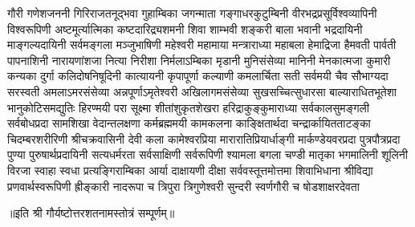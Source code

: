 
\twolineshloka
{गौरी गणेशजननी गिरिराजतनूद्भवा}
{गुहाम्बिका जगन्माता गङ्गाधरकुटुम्बिनी}
\twolineshloka
{वीरभद्रप्रसूर्विश्वव्यापिनी विश्वरूपिणी}
{अष्टमूर्त्यात्मिका कष्टदारिद्र्यशमनी शिवा}
\twolineshloka
{शाम्भवी शङ्करी बाला भवानी भद्रदायिनी}
{माङ्गल्यदायिनी सर्वमङ्गला मञ्जुभाषिणी}
\twolineshloka
{महेश्वरी महामाया मन्त्राराध्या महाबला}
{हेमाद्रिजा हैमवती पार्वती पापनाशिनी}
\twolineshloka
{नारायणांशजा नित्या निरीशा निर्मलाऽम्बिका}
{मृडानी मुनिसंसेव्या मानिनी मेनकात्मजा}
\twolineshloka
{कुमारी कन्यका दुर्गा कलिदोषनिषूदिनी}
{कात्यायनी कृपापूर्णा कल्याणी कमलार्चिता}
\twolineshloka
{सती सर्वमयी चैव सौभाग्यदा सरस्वती}
{अमलाऽमरसंसेव्या अन्नपूर्णाऽमृतेश्वरी}
\twolineshloka
{अखिलागमसंसेव्या सुखसच्चित्सुधारसा}
{बाल्याराधितभूतेशा भानुकोटिसमद्युतिः}
\twolineshloka
{हिरण्मयी परा सूक्ष्मा शीतांशुकृतशेखरा}
{हरिद्राकुङ्कुमाराध्या सर्वकालसुमङ्गली}
\twolineshloka
{सर्वबोधप्रदा सामशिखा वेदान्तलक्षणा}
{कर्मब्रह्ममयी कामकलना काङ्क्षितार्थदा}
\twolineshloka
{चन्द्रार्कायितताटङ्का चिदम्बरशरीरिणी}
{श्रीचक्रवासिनी देवी कला कामेश्वरप्रिया}
\twolineshloka
{मारारातिप्रियार्धाङ्गी मार्कण्डेयवरप्रदा}
{पुत्रपौत्रप्रदा पुण्या पुरुषार्थप्रदायिनी}
\twolineshloka
{सत्यधर्मरता सर्वसाक्षिणी सर्वरूपिणी}
{श्यामला बगला चण्डी मातृका भगमालिनी}
\twolineshloka
{शूलिनी विरजा स्वाहा स्वधा प्रत्यङ्गिराम्बिका}
{आर्या दाक्षायणी दीक्षा सर्ववस्तूत्तमोत्तमा}
\threelineshloka
{शिवाभिधाना श्रीविद्या प्रणवार्थस्वरूपिणी}
{ह्रीङ्कारी नादरूपा च त्रिपुरा त्रिगुणेश्वरी}
{सुन्दरी स्वर्णगौरी च षोडशाक्षरदेवता}

{॥इति श्री गौर्यष्टोत्तरशतनामस्तोत्रं सम्पूर्णम्॥}